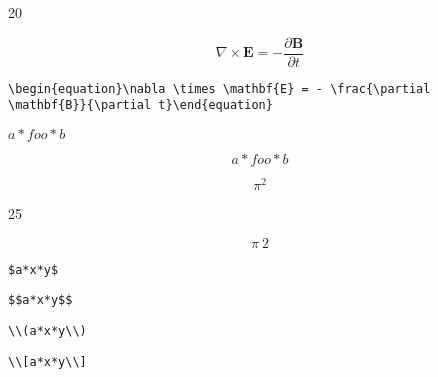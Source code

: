20

\begin{equation}\nabla \times \mathbf{E} = - \frac{\partial \mathbf{B}}{\partial t}\end{equation}

\texttt{\textbackslash{}begin\{equation\}\textbackslash{}nabla \textbackslash{}times \textbackslash{}mathbf\{E\} = - \textbackslash{}frac\{\textbackslash{}partial \textbackslash{}mathbf\{B\}\}\{\textbackslash{}partial t\}\textbackslash{}end\{equation\}}

$a *foo* b$

\[a *foo* b\]

\[\pi^2\]

25

\[\pi~2\]

\texttt{\$a*x*y\$}

\texttt{\$\$a*x*y\$\$}

\texttt{\textbackslash{}\textbackslash{}(a*x*y\textbackslash{}\textbackslash{})}

\texttt{\textbackslash{}\textbackslash{}[a*x*y\textbackslash{}\textbackslash{}]}



